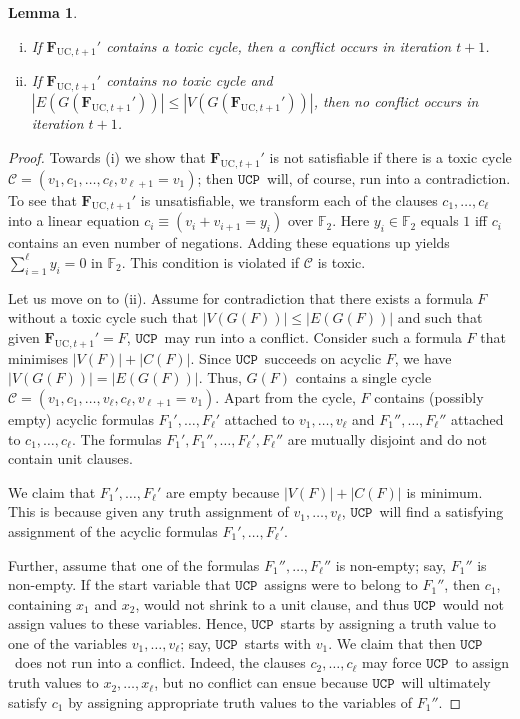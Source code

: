 \documentclass[10pt,reqno]{amsart}
\numberwithin{equation}{section}
\renewcommand{\vec}[1]{\boldsymbol{#1}}
\newcommand{\FUC}[1]{\PHI_{\mathrm{UC},{#1}}}
\newcommand{\UCP}{\ensuremath{\mathtt{UCP}}}
\newcommand\PHI{\vec F}
\newcommand\cC{\mathcal C}
\newcommand\FF{\mathbb{F}}
\newtheorem{lemma}[definition]{Lemma}
\begin{document}
\begin{lemma}\label{lem_tox}
	\begin{enumerate}[(i)]
		\item If $\FUC{t+1}'$ contains a toxic cycle, then a conflict occurs in iteration $t+1$.
		\item If $\FUC{t+1}'$ contains no toxic cycle and $|E(G(\FUC{t+1}'))|\leq|V(G(\FUC{t+1}'))|$, then no conflict occurs in iteration $t+1$.
	\end{enumerate}
\end{lemma}
\begin{proof}
	Towards (i) we show that $\FUC{t+1}'$ is not satisfiable if there is a toxic cycle $\cC=(v_1,c_1,\ldots,c_\ell,v_{\ell+1}=v_1)$; then \UCP\ will, of course, run into a contradiction.
	To see that $\FUC{t+1}'$ is unsatisfiable, we transform each of the clauses $c_1,\ldots,c_\ell$ into a linear equation $c_i\equiv(v_i+v_{i+1}=y_i)$ over $\FF_2$.
	Here $y_i\in\FF_2$ equals $1$ iff $c_i$ contains an even number of negations.
	Adding these equations up yields $\sum_{i=1}^\ell y_i=0$ in $\FF_2$.
	This condition is violated if $\cC$ is toxic. 

	Let us move on to (ii).
	Assume for contradiction that there exists a formula $F$ without a toxic cycle such that $|V(G(F))|\leq|E(G(F))|$ and such that given $\FUC{t+1}'=F$, \UCP\ may run into a conflict.
	Consider such a formula $F$ that minimises $|V(F)|+|C(F)|$.
	Since \UCP\ succeeds on acyclic $F$, we have $|V(G(F))|=|E(G(F))|$. 
	Thus, $G(F)$ contains a single cycle $\cC=(v_1,c_1,\ldots,v_\ell,c_\ell,v_{\ell+1}=v_1)$.
	Apart from the cycle, $F$ contains (possibly empty) acyclic formulas $F_1',\ldots,F_\ell'$ attached to $v_1,\ldots,v_\ell$ and $F_1'',\ldots,F_\ell''$ attached to $c_1,\ldots,c_\ell$.
	The formulas $F_1',F_1'',\ldots,F_\ell',F_\ell''$ are mutually disjoint and do not contain unit clauses. 	
	
	We claim that $F_1',\ldots,F_\ell'$ are empty because $|V(F)|+|C(F)|$ is minimum.
	This is because given any truth assignment of $v_1,\ldots,v_\ell$, \UCP\ will find a satisfying assignment of the acyclic formulas $F_1',\ldots,F_\ell'$.	

	Further, assume that one of the formulas $F_1'',\ldots,F_\ell''$ is non-empty; say, $F_1''$ is non-empty.
	If the start variable that \UCP\ assigns were to belong to $F_1''$, then $c_1$, containing $x_1$ and $x_2$, would not shrink to a unit clause, and thus \UCP\ would not assign values to these variables.
	Hence, \UCP\ starts by assigning a truth value to one of the variables $v_1,\ldots,v_\ell$; say, \UCP\ starts with $v_1$.
	We claim that then \UCP\ does not run into a conflict.
	Indeed, the clauses $c_2,\ldots,c_\ell$ may force \UCP\ to assign truth values to $x_2,\ldots,x_\ell$, but no conflict can ensue because \UCP\ will ultimately satisfy $c_1$ by assigning appropriate truth values to the variables of $F_1''$.


\end{proof}
\end{document}
